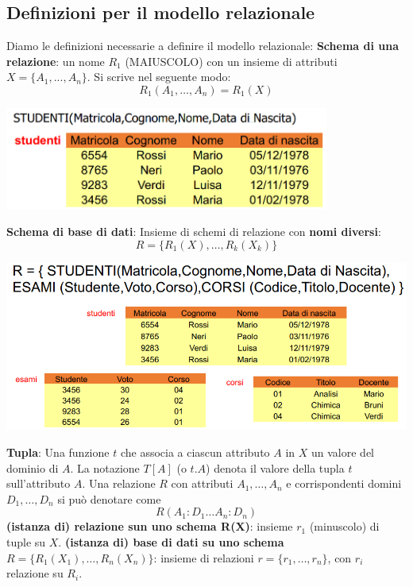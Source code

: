 \documentclass[12pt]{article}
\begin{document}
\subsection{Definizioni per il modello relazionale}
Diamo le definizioni necessarie a definire il modello relazionale: \newline
\textbf{Schema di una relazione}: un nome $R_1$ (MAIUSCOLO) con un insieme di attributi $X = \{A_1, ..., A_n\}$.
Si scrive nel seguente modo:
$$R_1(A_1,\dots,A_n) = R_1(X)$$
\begin{center}
    \includegraphics[width = 0.80\textwidth]{Images/80.PNG}
\end{center}
\textbf{Schema di base di dati}: Insieme di schemi di relazione con \textbf{nomi diversi}:
$$R = \{R_1(X),\dots,R_k(X_k)\}$$
\begin{center}
    \includegraphics[width = 1\textwidth]{Images/81.PNG}
\end{center}
\textbf{Tupla}: Una funzione $t$ che associa a ciascun attributo $A$ in $X$ un valore del dominio di $A$.
La notazione $T[A]$ (o $t.A$) denota il valore della tupla $t$ sull'attributo $A$.
Una relazione $R$ con attributi $A_1,\dots,A_n$ e corrispondenti domini $D_1, \dots, D_n$ si può denotare come
$$R(A_1: D_1 \dots A_n:D_n)$$
\textbf{(istanza di) relazione sun uno schema R(X)}: insieme $r_1$ (minuscolo) di tuple su $X$. \newline
\textbf{(istanza di) base di dati su uno schema $R = \{R_1(X_1),\dots, R_n(X_n)\}$}: insieme di relazioni $r = \{r_1,\dots,r_n\}$, con $r_i$ relazione su $R_i$.
\end{document}
